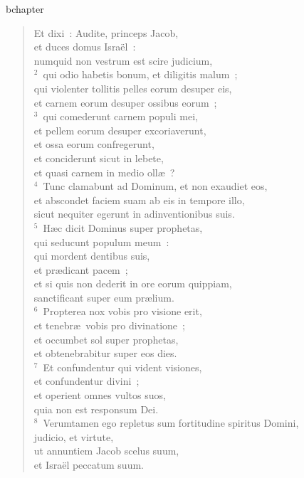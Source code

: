bchapter\begin{verse}\vspace{-19pt}Et dixi~: Audite, princeps Jacob,\\ et duces domus Isra\"el~:\\ numquid non vestrum est scire judicium,\\
${}^{2}$~qui odio habetis bonum, et diligitis malum~;\\ qui violenter tollitis pelles eorum desuper eis,\\ et carnem eorum desuper ossibus eorum~;\\
${}^{3}$~qui comederunt carnem populi mei,\\ et pellem eorum desuper excoriaverunt,\\ et ossa eorum confregerunt,\\ et conciderunt sicut in lebete,\\ et quasi carnem in medio oll\ae~?\\
${}^{4}$~Tunc clamabunt ad Dominum, et non exaudiet eos,\\ et abscondet faciem suam ab eis in tempore illo,\\ sicut nequiter egerunt in adinventionibus suis.\\
${}^{5}$~H\ae c dicit Dominus super prophetas,\\ qui seducunt populum meum~:\\ qui mordent dentibus suis,\\ et pr\ae dicant pacem~;\\ et si quis non dederit in ore eorum quippiam,\\ sanctificant super eum pr\ae lium.\\
${}^{6}$~Propterea nox vobis pro visione erit,\\ et tenebr\ae\ vobis pro divinatione~;\\ et occumbet sol super prophetas,\\ et obtenebrabitur super eos dies.\\
${}^{7}$~Et confundentur qui vident visiones,\\ et confundentur divini~;\\ et operient omnes vultos suos,\\ quia non est responsum Dei.\\
${}^{8}$~Verumtamen ego repletus sum fortitudine spiritus Domini,\\ judicio, et virtute,\\ ut annuntiem Jacob scelus suum,\\ et Isra\"el peccatum suum.\\

\end{verse}
